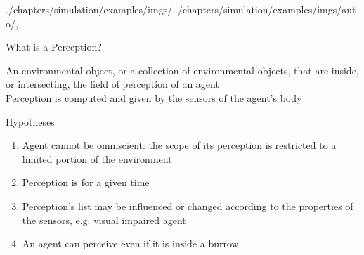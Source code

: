 \begin{graphicspathcontext}{{./chapters/simulation/examples/imgs/},{./chapters/simulation/examples/imgs/auto/},\old}
\begin{frame}{{What is a} Perception?}
	\begin{definition}
		An environmental object, or a collection of environmental objects, that are inside, or intersecting, the field of perception of an agent \\
		Perception is computed and given by the sensors of the agent's body
	\end{definition}
	\begin{alertblock}{Hypotheses}
		\begin{enumerate}
		\item Agent cannot be omniscient: the scope of its perception is restricted to a limited portion of the environment
		\item Perception is for a given time
		\item Perception's list may be influenced or changed according to the properties of the sensors, e.g. visual impaired agent
		\item An agent can perceive even if it is inside a burrow
		\end{enumerate}
	\end{alertblock}
\end{frame}



\end{graphicspathcontext}
